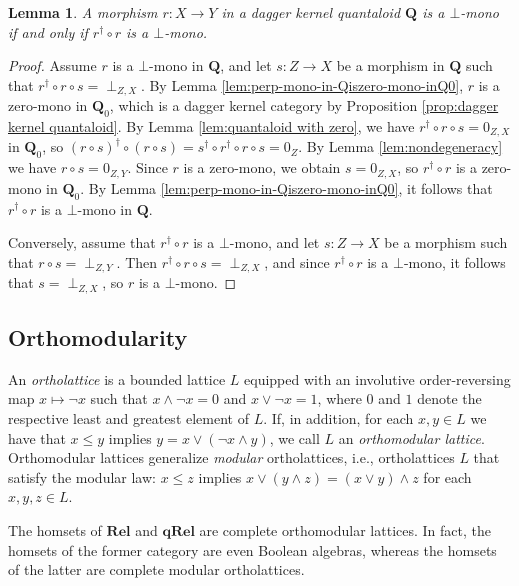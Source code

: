 \documentclass[12pt]{tac}
\newtheorem{lemma}[theorem]{Lemma}
\theoremstyle{definition}
\theoremstyle{remark}
\newcommand{\<}{\langle}
\renewcommand{\>}{\rangle}
\renewcommand{\:}{\colon}
\begin{document}
\begin{lemma}\label{lem:r-zero-mono-iff-rdagr-zero-mono}
    A morphism $r:X\to Y$ in a dagger kernel quantaloid $\mathbf Q$ is a $\bot$-mono if and only if $r^\dag\circ r$ is a $\bot$-mono. 
\end{lemma}
\begin{proof}
   Assume $r$ is a $\bot$-mono in $\mathbf Q$, and let $s:Z\to X$ be a morphism in $\mathbf Q$ such that $r^\dag\circ r\circ s=\perp_{Z,X}$. By Lemma \ref{lem:perp-mono-in-Qiszero-mono-inQ0}, $r$ is a zero-mono in $\mathbf Q_0$, which is a dagger kernel category by Proposition \ref{prop:dagger kernel quantaloid}. By Lemma \ref{lem:quantaloid with zero}, we have $r^\dag\circ r\circ s=0_{Z,X}$ in $\mathbf Q_0$, so $(r\circ s)^\dag\circ (r\circ s)=s^\dag\circ r^\dag\circ r\circ s=0_Z$. By Lemma \ref{lem:nondegeneracy} we have $r\circ s=0_{Z,Y}$. Since $r$ is a zero-mono, we obtain $s=0_{Z,X}$, so $r^\dag\circ r$ is a zero-mono in $\mathbf Q_0$. By Lemma \ref{lem:perp-mono-in-Qiszero-mono-inQ0}, it follows that $r^\dag\circ r$ is a $\bot$-mono in $\mathbf Q$.

    Conversely, assume that $r^\dag\circ r$ is a $\bot$-mono, and let $s:Z\to X$ be a morphism such that $r\circ s=\perp_{Z,Y}$. Then $r^\dag\circ r\circ s=\perp_{Z,X}$, and since $r^\dag\circ r$ is a $\bot$-mono, it follows that $s=\perp_{Z,X}$, so $r$ is a $\bot$-mono. 
\end{proof}

\subsection{Orthomodularity}
An \emph{ortholattice} is a bounded lattice $L$ equipped with an involutive order-reversing map $x\mapsto \neg x$ such that $x\wedge \neg x=0$ and $x\vee \neg x=1$, where $0$ and $1$ denote the respective least and greatest element of $L$. If, in addition, for each $x,y\in L$ we have that $x\leq y$ implies $y=x\vee(\neg x\wedge y)$, we call $L$ an \emph{orthomodular lattice}. Orthomodular lattices generalize \emph{modular} ortholattices, i.e., ortholattices $L$ that satisfy the modular law: $x\leq z$ implies $x\vee(y\wedge z)=(x\vee y)\wedge z$ for each $x,y,z\in L$. 

The homsets of $\mathbf{Rel}$ and $\mathbf{qRel}$ are complete orthomodular lattices. In fact, the homsets of the former category are even Boolean algebras, whereas the homsets of the latter are complete modular ortholattices.
\end{document}
